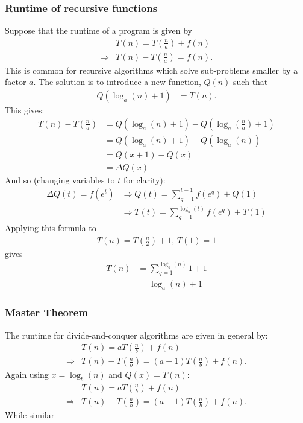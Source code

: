 \documentclass{article}
\renewcommand\({\left(}
\renewcommand\){\right)}
\begin{document}
\subsubsection{Runtime of recursive functions}
Suppose that the runtime of a program is given by
\begin{align*}
    &T(n)=T\left(\frac{n}{a}\right)+f(n)\\
    \Rightarrow &T(n)-T\left(\frac{n}{a}\right)=f(n).
\end{align*}
This is common for recursive algorithms which solve sub-problems smaller by a factor $a$. The solution is to introduce a new function, $Q(n)$ such that 
\begin{align*}
    Q\left(\log_a(n)+1\right)&=T(n).
\end{align*}
This gives:
\begin{align*}
    T(n)-T\left(\frac{n}{a}\right)&=Q\left(\log_a(n)+1\right)-Q\left(\log_a\left(\frac{n}{a}\right)+1\right)\\
    &=Q\left(\log_a(n)+1\right)-Q\left(\log_a\left(n\right)\right)\\
    &=Q(x+1)-Q(x)\tag*{($x=\log_a(n)$)}\\
    &=\Delta Q(x)
\end{align*}
And so (changing variables to $t$ for clarity):
\begin{align*}
    \Delta Q(t)=f(e^t)&\Rightarrow Q(t)=\sum_{q=1}^{t-1} f(e^q)+Q(1)\\
    &\Rightarrow T(t)=\sum_{q=1}^{\log_a(t)} f(e^q)+T(1)
\end{align*}
Applying this formula to
\begin{align*}
    T(n)=T\left(\frac{n}{2}\right)+1,\,T(1)=1
\end{align*}
gives
\begin{align*}
    T(n)&=\sum_{q=1}^{\log_a(n)} 1+1\\
    &=\log_a(n)+1
\end{align*}

\subsubsection{Master Theorem}
The runtime for divide-and-conquer algorithms are given in general by:
\begin{align*}
    &T(n)=aT\left(\frac{n}{b}\right)+f(n)\\
    \Rightarrow &T(n)-T\left(\frac{n}{b}\right)=(a-1)T\left(\frac{n}{b}\right)+f(n).
\end{align*}
Again using $x=\log_b(n)$ and $Q(x)=T(n)$:
\begin{align*}
    &T(n)=aT\left(\frac{n}{b}\right)+f(n)\\
    \Rightarrow &T(n)-T\left(\frac{n}{b}\right)=(a-1)T\left(\frac{n}{b}\right)+f(n).
\end{align*}
While similar
\end{document}
